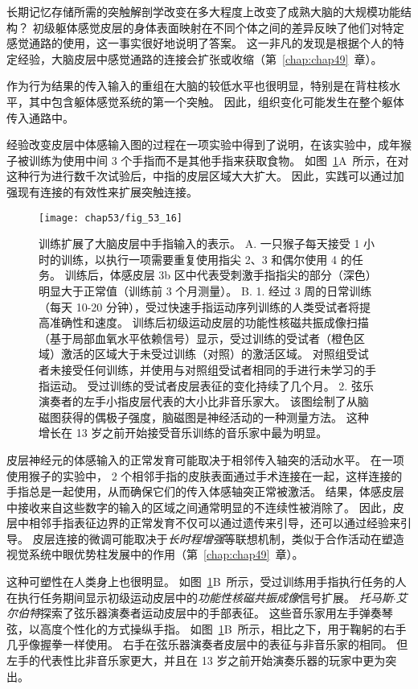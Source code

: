 长期记忆存储所需的突触解剖学改变在多大程度上改变了成熟大脑的大规模功能结构？
初级躯体感觉皮层的身体表面映射在不同个体之间的差异反映了他们对特定感觉通路的使用，这一事实很好地说明了答案。
这一非凡的发现是根据个人的特定经验，大脑皮层中感觉通路的连接会扩张或收缩（第~\ref{chap:chap49}~章）。


作为行为结果的传入输入的重组在大脑的较低水平也很明显，特别是在背柱核水平，其中包含躯体感觉系统的第一个突触。
因此，组织变化可能发生在整个躯体传入通路中。


经验改变皮层中体感输入图的过程在一项实验中得到了说明，在该实验中，成年猴子被训练为使用中间 3 个手指而不是其他手指来获取食物。
如图~\ref{fig:53_16}A~所示，在对这种行为进行数千次试验后，中指的皮层区域大大扩大。
因此，实践可以通过加强现有连接的有效性来扩展突触连接。


\begin{figure}[htbp]
	\centering
	\texttt{[image: chap53/fig\_53\_16]}
	\caption{训练扩展了大脑皮层中手指输入的表示。
		A. 一只猴子每天接受 1 小时的训练，以执行一项需要重复使用指尖 2、3 和偶尔使用 4 的任务。
		训练后，体感皮层 3b 区中代表受刺激手指指尖的部分（深色）明显大于正常值（训练前 3 个月测量）\cite{jenkins1990functional}。
		B. 1. 经过 3 周的日常训练（每天 10-20 分钟），受过快速手指运动序列训练的人类受试者将提高准确性和速度。
		训练后初级运动皮层的功能性核磁共振成像扫描（基于局部血氧水平依赖信号）显示，受过训练的受试者（橙色区域）激活的区域大于未受过训练（对照）的激活区域。
		对照组受试者未接受任何训练，并使用与对照组受试者相同的手进行未学习的手指运动。
		受过训练的受试者皮层表征的变化持续了几个月。
		2. 弦乐演奏者的左手小指皮层代表的大小比非音乐家大。
		该图绘制了从脑磁图获得的偶极子强度，脑磁图是神经活动的一种测量方法。
		这种增长在 13 岁之前开始接受音乐训练的音乐家中最为明显\cite{elbert1995increased}。}
	\label{fig:53_16}
\end{figure}


皮层神经元的体感输入的正常发育可能取决于相邻传入轴突的活动水平。
在一项使用猴子的实验中， 2 个相邻手指的皮肤表面通过手术连接在一起，这样连接的手指总是一起使用，从而确保它们的传入体感轴突正常被激活。
结果，体感皮层中接收来自这些数字的输入的区域之间通常明显的不连续性被消除了。
因此，皮层中相邻手指表征边界的正常发育不仅可以通过遗传来引导，还可以通过经验来引导。
皮层连接的微调可能取决于\textit{长时程增强}等联想机制，类似于合作活动在塑造视觉系统中眼优势柱发展中的作用（第~\ref{chap:chap49}~章）。


这种可塑性在人类身上也很明显。
如图~\ref{fig:53_16}B~所示，受过训练用手指执行任务的人在执行任务期间显示初级运动皮层中的\textit{功能性核磁共振成像}信号扩展。
\textit{托马斯$\cdot$艾尔伯特}探索了弦乐器演奏者运动皮层中的手部表征。
这些音乐家用左手弹奏琴弦，以高度个性化的方式操纵手指。
如图~\ref{fig:53_16}B~所示，相比之下，用于鞠躬的右手几乎像握拳一样使用。
右手在弦乐器演奏者皮层中的表征与非音乐家的相同。
但左手的代表性比非音乐家更大，并且在 13 岁之前开始演奏乐器的玩家中更为突出。



